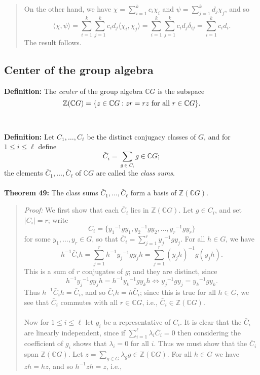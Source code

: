 {\begin{quote}
On the other hand, we have $\chi=\sum_{i=1}^kc_i\chi_i$ and
$\psi=\sum_{j=1}^kd_j\chi_j$, and so
$$\langle\chi,\psi\rangle
=\sum_{i=1}^k\sum_{j=1}^kc_id_j\langle\chi_i,\chi_j\rangle
=\sum_{i=1}^k\sum_{j=1}^kc_id_j\delta_{ij}=\sum_{i=1}^kc_id_i.$$
The result follows.
\end{quote}

\subsection{Center of the group algebra}
{\bf Definition:} The \emph{center} of the group algebra ${\mathbb C}G$ is the
subspace
$${\mathbb Z}({\mathbb C}G)=\{z\in{\mathbb C}G:zr=rz\hbox{ for all }r\in{\mathbb C}G\}.$$
\\
\\
{\bf Definition:} Let $C_1,\dots,C_\ell$ be the distinct conjugacy
classes of $G$, and for $1\leq i\leq\ell$ define
$$\bar C_i=\sum_{g\in C_i}g\in{\mathbb C}G;$$
the elements $\bar C_1,\dots,\bar C_\ell$ of ${\mathbb C}G$ are called the \emph{class
sums}.
\\
\\
{\bf Theorem 49:} The class sums
$\bar C_1,\dots,\bar C_\ell$ form a basis of ${\mathbb Z}({\mathbb C}G)$.
\begin{quote}
\emph{Proof:}
We first show that each $\bar C_i$ lies in ${\mathbb Z}({\mathbb C}G)$. Let $g\in C_i$, and
set $|C_i|=r$; write
$$C_i=\{{y_1}^{-1}gy_1,{y_2}^{-1}gy_2,\dots,{y_r}^{-1}gy_r\}$$
for some $y_1,\dots,y_r\in G$, so that
$\bar C_i=\sum_{j=1}^r{y_j}^{-1}gy_j$. For all $h\in G$, we have
$$h^{-1}\bar C_ih=\sum_{j=1}^rh^{-1}{y_j}^{-1}gy_jh
=\sum_{j=1}^r(y_jh)^{-1}g(y_jh).$$
This is a sum of $r$ conjugates of $g$; and they are distinct, since
$$h^{-1}{y_j}^{-1}gy_jh=h^{-1}{y_k}^{-1}gy_kh
\iff{y_j}^{-1}gy_j={y_k}^{-1}gy_k.$$
Thus $h^{-1}\bar C_ih=\bar C_i$, and so $\bar C_ih=h\bar C_i$; since this is
true for all $h\in G$, we see that $\bar C_i$ commutes with all $r\in{\mathbb C}G$,
i.e., $\bar C_i\in {\mathbb Z}({\mathbb C}G)$.
\\
\\
Now for $1\leq i\leq\ell$ let $g_i$ be a representative of $C_i$.
It is clear that the $\bar C_i$ are linearly independent,
since if $\sum_{i=1}^\ell\lambda_i\bar C_i=0$ then considering the
coefficient of $g_i$ shows that $\lambda_i=0$ for all $i$. Thus we must
show that the $\bar C_i$ span ${\mathbb Z}({\mathbb C}G)$. Let
$z=\sum_{g\in G}\lambda_gg\in {\mathbb Z}({\mathbb C}G)$. For
all $h\in G$ we have $zh=hz$, and so $h^{-1}zh=z$, i.e.,

\end{quote}}
